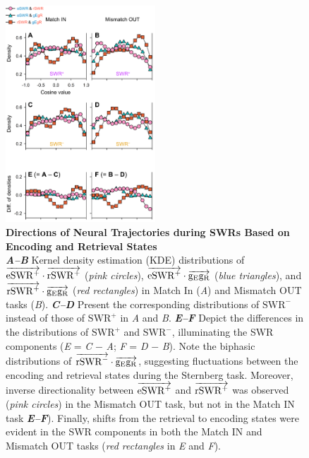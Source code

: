 \documentclass[final,3p,times,twocolumn]{elsarticle}
\begin{document}
        \clearpage
        \begin{figure}[ht]
        	\centering
            \includegraphics[width=0.5\textwidth]{./src/figures/.png/Figure_ID_07.png}
        	\caption{\textbf{
Directions of Neural Trajectories during SWRs Based on Encoding and Retrieval States
}
\smallskip
\\
\textbf{\textit{A--B}} Kernel density estimation (KDE) distributions of $\protect\overrightarrow{{\mathrm{eSWR^+}}} \cdot \protect\overrightarrow{{\mathrm{rSWR^+}}}$ (\textit{pink circles}), $\protect\overrightarrow{{\mathrm{eSWR^+}}} \cdot \protect\overrightarrow{{\mathrm{g_{E}g_{R}}}}$ (\textit{blue triangles}), and $\protect\overrightarrow{{\mathrm{rSWR^+}}} \cdot \protect\overrightarrow{{\mathrm{g_{E}g_{R}}}}$ (\textit{red rectangles}) in Match In (\textit{A}) and Mismatch OUT tasks (\textit{B}). \textbf{\textit{C--D}} Present the corresponding distributions of $\mathrm{SWR^-}$ instead of those of $\mathrm{SWR^+}$ in \textit{A} and \textit{B}. \textbf{\textit{E--F}} Depict the differences in the distributions of $\mathrm{SWR^+}$ and $\mathrm{SWR^-}$, illuminating the SWR components (\textit{E} = \textit{C} $-$ \textit{A}; \textit{F} = \textit{D} $-$ \textit{B}). Note the biphasic distributions of $\protect\overrightarrow{{\mathrm{rSWR^-}}} \cdot \protect\overrightarrow{{\mathrm{g_{E}g_{R}}}}$, suggesting fluctuations between the encoding and retrieval states during the Sternberg task. Moreover, inverse directionality between $\protect\overrightarrow{{\mathrm{eSWR^+}}}$ and $\protect\overrightarrow{{\mathrm{rSWR^+}}}$ was observed (\textit{pink circles}) in the Mismatch OUT task, but not in the Match IN task \textbf{\textit{E--F}}). Finally, shifts from the retrieval to encoding states were evident in the SWR components in both the Match IN and Mismatch OUT tasks (\textit{red rectangles} in \textit{E} and \textit{F}).
}
        	\label{fig:07}
        \end{figure}

\end{document}
